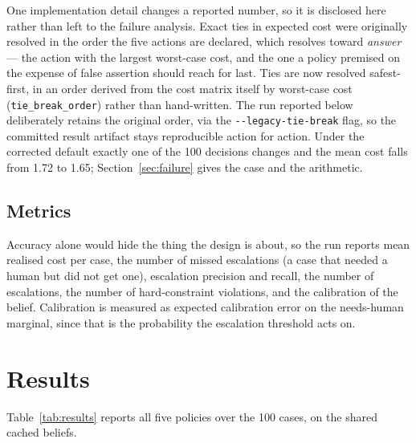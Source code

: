 \documentclass{article}
\begin{document}
One implementation detail changes a reported number, so it is disclosed here
rather than left to the failure analysis. Exact ties in expected cost were
originally resolved in the order the five actions are declared, which resolves
toward \emph{answer} --- the action with the largest worst-case cost, and the one a
policy premised on the expense of false assertion should reach for last. Ties are
now resolved safest-first, in an order derived from the cost matrix itself by
worst-case cost (\texttt{tie\_break\_order}) rather than hand-written. The run
reported below deliberately retains the original order, via the
\texttt{-}\texttt{-legacy-tie-break} flag, so the committed result artifact stays
reproducible action for action. Under the corrected default exactly one of the 100
decisions changes and the mean cost falls from 1.72 to 1.65;
Section~\ref{sec:failure} gives the case and the arithmetic.

\subsection{Metrics}
Accuracy alone would hide the thing the design is about, so the run reports mean
realised cost per case, the number of missed escalations (a case that needed a
human but did not get one), escalation precision and recall, the number of
escalations, the number of hard-constraint violations, and the calibration of the
belief. Calibration is measured as expected calibration error on the needs-human
marginal, since that is the probability the escalation threshold acts on.

\section{Results}
\label{sec:results}

Table~\ref{tab:results} reports all five policies over the 100 cases, on the
shared cached beliefs.
\end{document}
